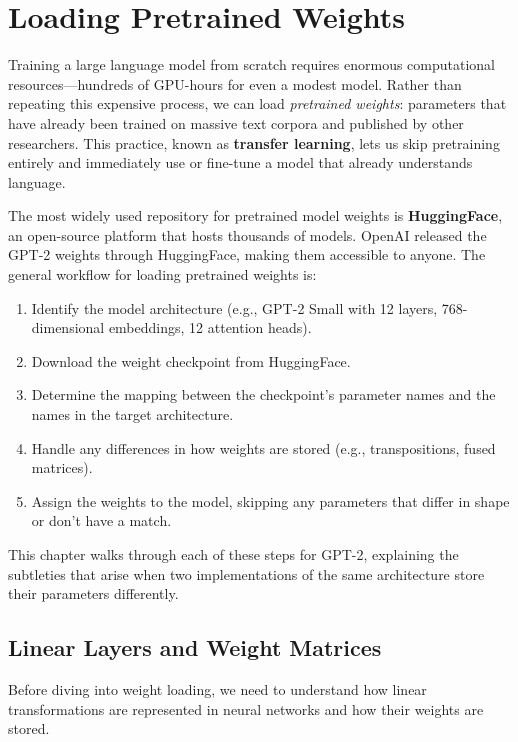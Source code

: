 \chapter{Loading Pretrained Weights}

Training a large language model from scratch requires enormous computational
resources---hundreds of GPU-hours for even a modest model. Rather than
repeating this expensive process, we can load \emph{pretrained weights}:
parameters that have already been trained on massive text corpora and
published by other researchers. This practice, known as \textbf{transfer
learning}, lets us skip pretraining entirely and immediately use or
fine-tune a model that already understands language.

The most widely used repository for pretrained model weights is
\textbf{HuggingFace}, an open-source platform that hosts thousands of
models. OpenAI released the GPT-2 weights through HuggingFace, making them
accessible to anyone. The general workflow for loading pretrained weights
is:

\begin{enumerate}
  \item Identify the model architecture (e.g., GPT-2 Small with 12 layers,
        768-dimensional embeddings, 12 attention heads).
  \item Download the weight checkpoint from HuggingFace.
  \item Determine the mapping between the checkpoint's parameter names and
        the names in the target architecture.
  \item Handle any differences in how weights are stored (e.g.,
        transpositions, fused matrices).
  \item Assign the weights to the model, skipping any parameters that
        differ in shape or don't have a match.
\end{enumerate}

This chapter walks through each of these steps for GPT-2, explaining the
subtleties that arise when two implementations of the same architecture
store their parameters differently.

\section{Linear Layers and Weight Matrices}

Before diving into weight loading, we need to understand how linear
transformations are represented in neural networks and how their weights
are stored.


